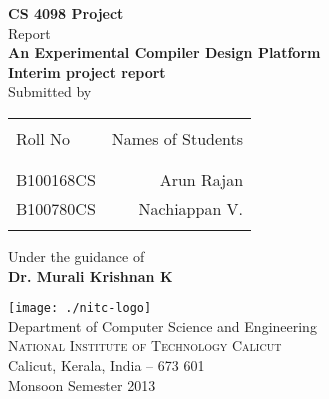 \begin{titlepage}

\begin{center}

\textup{\small {\bf CS 4098 Project} \\ Report}\\[0.2in]

\Large \textbf {An Experimental Compiler Design Platform}\\[0.5in]

       

       {\bf Interim project report}\\[0.5in]

\normalsize Submitted by \\
\begin{table}[h]
\centering
\begin{tabular}{lr}\hline \\
Roll No & Names of Students \\ \\ \hline
\\
B100168CS & Arun Rajan \\
B100780CS & Nachiappan V. \\ \\ \hline 
\end{tabular}
\end{table}

\vspace{.1in}
Under the guidance of\\
{\textbf{Dr. Murali Krishnan K}}\\[0.2in]

\vfill

\texttt{[image: ./nitc-logo]}\\[0.1in]
\Large{Department of Computer Science and Engineering}\\
\normalsize
\textsc{National Institute of Technology Calicut}\\
Calicut, Kerala, India -- 673 601 \\
\vspace{0.2cm}
Monsoon Semester 2013

\end{center}

\end{titlepage}
